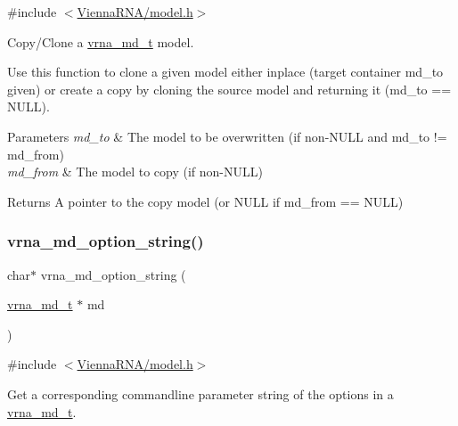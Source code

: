 {\ttfamily \#include $<$\mbox{\hyperlink{model_8h}{Vienna\+R\+N\+A/model.\+h}}$>$}



Copy/\+Clone a \mbox{\hyperlink{group__model__details_ga1f8a10e12a0a1915f2a4eff0b28ea17c}{vrna\+\_\+md\+\_\+t}} model. 

Use this function to clone a given model either inplace (target container {\ttfamily md\+\_\+to} given) or create a copy by cloning the source model and returning it ({\ttfamily md\+\_\+to} == N\+U\+LL).


\begin{DoxyParams}{Parameters}
{\em md\+\_\+to} & The model to be overwritten (if non-\/\+N\+U\+LL and {\ttfamily md\+\_\+to} != {\ttfamily md\+\_\+from}) \\
\hline
{\em md\+\_\+from} & The model to copy (if non-\/\+N\+U\+LL) \\
\hline
\end{DoxyParams}
\begin{DoxyReturn}{Returns}
A pointer to the copy model (or N\+U\+LL if {\ttfamily md\+\_\+from} == N\+U\+LL) 
\end{DoxyReturn}
\mbox{\label{group__model__details_ga3a7469f0725a849af6ba61a57dfd60ce}} 
\subsubsection{\texorpdfstring{vrna\_md\_option\_string()}{vrna\_md\_option\_string()}}
{\footnotesize\ttfamily char$\ast$ vrna\+\_\+md\+\_\+option\+\_\+string (\begin{DoxyParamCaption}\item[{\mbox{\hyperlink{group__model__details_ga1f8a10e12a0a1915f2a4eff0b28ea17c}{vrna\+\_\+md\+\_\+t}} $\ast$}]{md }\end{DoxyParamCaption})}



{\ttfamily \#include $<$\mbox{\hyperlink{model_8h}{Vienna\+R\+N\+A/model.\+h}}$>$}



Get a corresponding commandline parameter string of the options in a \mbox{\hyperlink{group__model__details_ga1f8a10e12a0a1915f2a4eff0b28ea17c}{vrna\+\_\+md\+\_\+t}}. 

